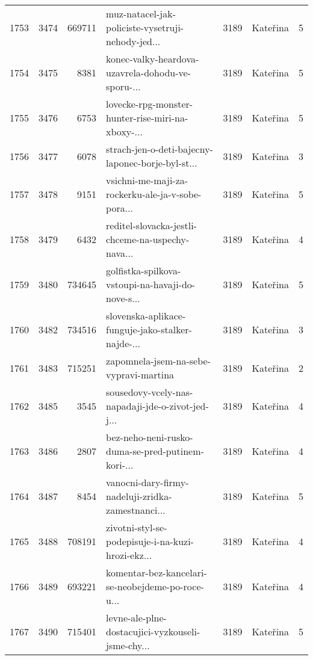 \begin{tabular}{lrrlrlr}
1753 &       3474 &   669711 &  muz-natacel-jak-policiste-vysetruji-nehody-jed... &     3189 &                     Kateřina &               5 \\
1754 &       3475 &     8381 &  konec-valky-heardova-uzavrela-dohodu-ve-sporu-... &     3189 &                     Kateřina &               5 \\
1755 &       3476 &     6753 &  lovecke-rpg-monster-hunter-rise-miri-na-xboxy-... &     3189 &                     Kateřina &               5 \\
1756 &       3477 &     6078 &  strach-jen-o-deti-bajecny-laponec-borje-byl-st... &     3189 &                     Kateřina &               3 \\
1757 &       3478 &     9151 &  vsichni-me-maji-za-rockerku-ale-ja-v-sobe-pora... &     3189 &                     Kateřina &               5 \\
1758 &       3479 &     6432 &  reditel-slovacka-jestli-chceme-na-uspechy-nava... &     3189 &                     Kateřina &               4 \\
1759 &       3480 &   734645 &  golfistka-spilkova-vstoupi-na-havaji-do-nove-s... &     3189 &                     Kateřina &               5 \\
1760 &       3482 &   734516 &  slovenska-aplikace-funguje-jako-stalker-najde-... &     3189 &                     Kateřina &               3 \\
1761 &       3483 &   715251 &             zapomnela-jsem-na-sebe-vypravi-martina &     3189 &                     Kateřina &               2 \\
1762 &       3485 &     3545 &  sousedovy-vcely-nas-napadaji-jde-o-zivot-jed-j... &     3189 &                     Kateřina &               4 \\
1763 &       3486 &     2807 &  bez-neho-neni-rusko-duma-se-pred-putinem-kori-... &     3189 &                     Kateřina &               4 \\
1764 &       3487 &     8454 &  vanocni-dary-firmy-nadeluji-zridka-zamestnanci... &     3189 &                     Kateřina &               5 \\
1765 &       3488 &   708191 &  zivotni-styl-se-podepisuje-i-na-kuzi-hrozi-ekz... &     3189 &                     Kateřina &               4 \\
1766 &       3489 &   693221 &  komentar-bez-kancelari-se-neobejdeme-po-roce-u... &     3189 &                     Kateřina &               4 \\
1767 &       3490 &   715401 &  levne-ale-plne-dostacujici-vyzkouseli-jsme-chy... &     3189 &                     Kateřina &               5 \\

\end{tabular}

